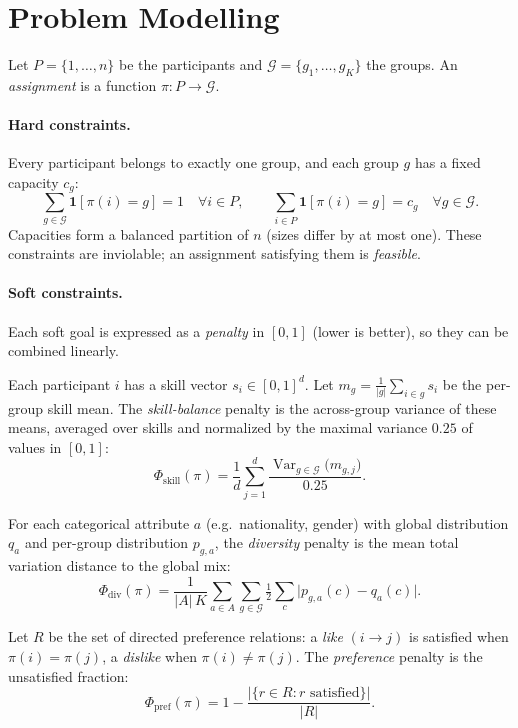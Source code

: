 \documentclass[11pt]{article}
\begin{document}
\section{Problem Modelling}
\label{sec:model}
Let $P=\{1,\dots,n\}$ be the participants and $\mathcal{G}=\{g_1,\dots,g_K\}$ the groups.
An \emph{assignment} is a function $\pi:P\to\mathcal{G}$.

\paragraph{Hard constraints.} Every participant belongs to exactly one group, and each
group $g$ has a fixed capacity $c_g$:
\begin{equation}
\sum_{g\in\mathcal{G}} \mathbf{1}[\pi(i)=g]=1 \quad\forall i\in P,
\qquad
\sum_{i\in P}\mathbf{1}[\pi(i)=g]=c_g \quad\forall g\in\mathcal{G}.
\end{equation}
Capacities form a balanced partition of $n$ (sizes differ by at most one). These constraints
are inviolable; an assignment satisfying them is \emph{feasible}.

\paragraph{Soft constraints.} Each soft goal is expressed as a \emph{penalty} in $[0,1]$
(lower is better), so they can be combined linearly.

Each participant $i$ has a skill vector $s_i\in[0,1]^d$. Let
$m_g=\frac{1}{|g|}\sum_{i\in g}s_i$ be the per-group skill mean. The \emph{skill-balance}
penalty is the across-group variance of these means, averaged over skills and normalized by
the maximal variance $0.25$ of values in $[0,1]$:
\begin{equation}
\Phi_{\text{skill}}(\pi)=\frac{1}{d}\sum_{j=1}^{d}
\frac{\operatorname{Var}_{g\in\mathcal{G}}\big(m_{g,j}\big)}{0.25}.
\end{equation}

For each categorical attribute $a$ (e.g.\ nationality, gender) with global distribution
$q_a$ and per-group distribution $p_{g,a}$, the \emph{diversity} penalty is the mean total
variation distance to the global mix:
\begin{equation}
\Phi_{\text{div}}(\pi)=\frac{1}{|A|\,K}\sum_{a\in A}\sum_{g\in\mathcal{G}}
\tfrac{1}{2}\sum_{c}\big|p_{g,a}(c)-q_a(c)\big|.
\end{equation}

Let $R$ be the set of directed preference relations: a \emph{like} $(i\!\to\! j)$ is
satisfied when $\pi(i)=\pi(j)$, a \emph{dislike} when $\pi(i)\neq\pi(j)$. The
\emph{preference} penalty is the unsatisfied fraction:
\begin{equation}
\Phi_{\text{pref}}(\pi)=1-\frac{|\{r\in R: r\text{ satisfied}\}|}{|R|}.
\end{equation}
\end{document}
